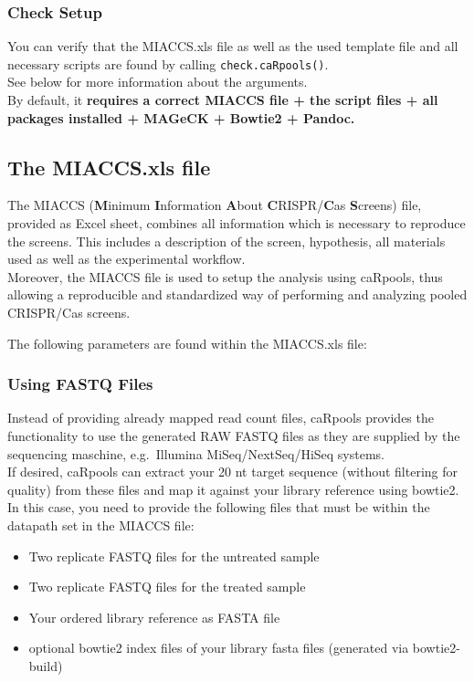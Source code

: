 \documentclass[]{article}
\providecommand{\tightlist}{%
  \setlength{\itemsep}{0pt}\setlength{\parskip}{0pt}}
\begin{document}
\subsubsection{Check Setup}\label{check-setup}

You can verify that the MIACCS.xls file as well as the used template
file and all necessary scripts are found by calling
\texttt{check.caRpools()}.\\
See below for more information about the arguments.\\
By default, it \textbf{requires a correct MIACCS file + the script files
+ all packages installed + MAGeCK + Bowtie2 + Pandoc.}

\subsection{The MIACCS.xls file}\label{the-miaccs.xls-file}

The MIACCS (\textbf{M}inimum \textbf{I}nformation \textbf{A}bout
\textbf{C}RISPR/\textbf{C}as \textbf{S}creens) file, provided as Excel
sheet, combines all information which is necessary to reproduce the
screens. This includes a description of the screen, hypothesis, all
materials used as well as the experimental workflow.\\
Moreover, the MIACCS file is used to setup the analysis using caRpools,
thus allowing a reproducible and standardized way of performing and
analyzing pooled CRISPR/Cas screens.

The following parameters are found within the MIACCS.xls file:

\subsubsection{Using FASTQ Files}\label{using-fastq-files}

Instead of providing already mapped read count files, caRpools provides
the functionality to use the generated RAW FASTQ files as they are
supplied by the sequencing maschine, e.g.~Illumina MiSeq/NextSeq/HiSeq
systems.\\
If desired, caRpools can extract your 20 nt target sequence (without
filtering for quality) from these files and map it against your library
reference using bowtie2. In this case, you need to provide the following
files that must be within the datapath set in the MIACCS file:

\begin{itemize}
\tightlist
\item
  Two replicate FASTQ files for the untreated sample
\item
  Two replicate FASTQ files for the treated sample
\item
  Your ordered library reference as FASTA file
\item
  optional bowtie2 index files of your library fasta files (generated
  via bowtie2-build)
\end{itemize}
\end{document}
